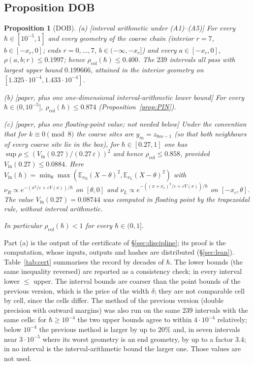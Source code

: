 \documentclass[11pt,a4paper]{article}
\newtheorem{proposition}[theorem]{Proposition}
\theoremstyle{definition}
\theoremstyle{remark}
\newcommand{\E}{\mathbb{E}}
\newcommand{\xc}{x_c}
\newcommand{\rcol}{\rho_{\mathrm{col}}}
\begin{document}
\subsection{Proposition DOB}

\begin{proposition}[DOB]\label{prop:DOB}
\textup{(a) [interval arithmetic under (A1)--(A5)]} For every $\hbar\in[10^{-5},1]$ and every geometry of the coarse chain \textup{(}interior $r=7$, $b\in[-\xc,0]$; ends $r=0,\dots,7$, $b\in(-\infty,-\xc]$\textup{)} and every $a\in[-\xc,0]$, $\rho(a,b;r)\le0.1997$; hence $\rcol(\hbar)\le0.400$. The $239$ intervals all pass with largest upper bound $0.199666$, attained in the interior geometry on $[1.325\cdot10^{-4},1.433\cdot10^{-4}]$.

\textup{(b) [paper, plus one one-dimensional interval-arithmetic lower bound]} For every $\hbar\in(0,10^{-5}]$, $\rcol(\hbar)\le0.874$ \textup{(}Proposition~\ref{prop:PIN}\textup{)}.

\textup{(c) [paper, plus one floating-point value; not needed below]} Under the convention that for $k\equiv0\pmod 8$ the coarse sites are $y_m=z_{8m-1}$ \textup{(}so that both neighbours of every coarse site lie in the box\textup{)}, for $\hbar\in[0.27,1]$ one has $\sup\rho\le(V_{\mathrm{in}}(0.27)/(0.27\,\varepsilon))^2$ and hence $\rcol\le0.858$, provided $V_{\mathrm{in}}(0.27)\le0.0884$. Here $V_{\mathrm{in}}(\hbar)=\min_\theta\max(\E_{\nu_R}(X-\theta)^2,\E_{\nu_L}(X-\theta)^2)$ with $\nu_R\propto e^{-(x^2/\varepsilon+\varepsilon V(x))/\hbar}$ on $[\theta,0]$ and $\nu_L\propto e^{-((x+\xc)^2/\varepsilon+\varepsilon V(x))/\hbar}$ on $[-\xc,\theta]$. The value $V_{\mathrm{in}}(0.27)=0.08744$ was computed in floating point by the trapezoidal rule, without interval arithmetic.

In particular $\rcol(\hbar)<1$ for every $\hbar\in(0,1]$.
\end{proposition}

Part (a) is the output of the certificate of \S\ref{sec:discipline}; its proof is the computation, whose inputs, outputs and hashes are distributed (\S\ref{sec:lean}). Table~\ref{tab:cert} summarises the record by decades of $\hbar$. The lower bounds (the same inequality reversed) are reported as a consistency check; in every interval lower $\le$ upper. The interval bounds are coarser than the point bounds of the previous version, which is the price of the width $\delta$; they are not comparable cell by cell, since the cells differ. The method of the previous version (double precision with outward margins) was also run on the same $239$ intervals with the same cells: for $\hbar\ge10^{-4}$ the two upper bounds agree to within $4\cdot10^{-4}$ relatively; below $10^{-4}$ the previous method is larger by up to $20\%$ and, in seven intervals near $3\cdot10^{-5}$ where its worst geometry is an end geometry, by up to a factor $3.4$; in no interval is the interval-arithmetic bound the larger one. Those values are not used.
\end{document}
